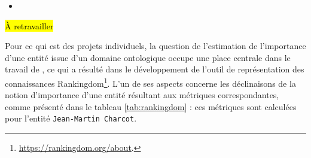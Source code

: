 \begin{itemize}
	\item \citet{soulet2024}
\end{itemize}
\hl{À retravailler}


Pour ce qui est des projets individuels, la question de l'estimation de l'importance d'une entité issue d'un domaine ontologique occupe une place centrale dans le travail de \citet{soulet2024}, ce qui a résulté dans le développement de l'outil de représentation des connaissances Rankingdom\footnote{\url{https://rankingdom.org/about}.}. L'un de ses aspects concerne les déclinaisons de la notion d'importance d'une entité résultant aux métriques correspondantes, comme présenté dans le tableau \ref{tab:rankingdom} : ces métriques sont calculées pour l'entité \texttt{Jean-Martin Charcot}.

